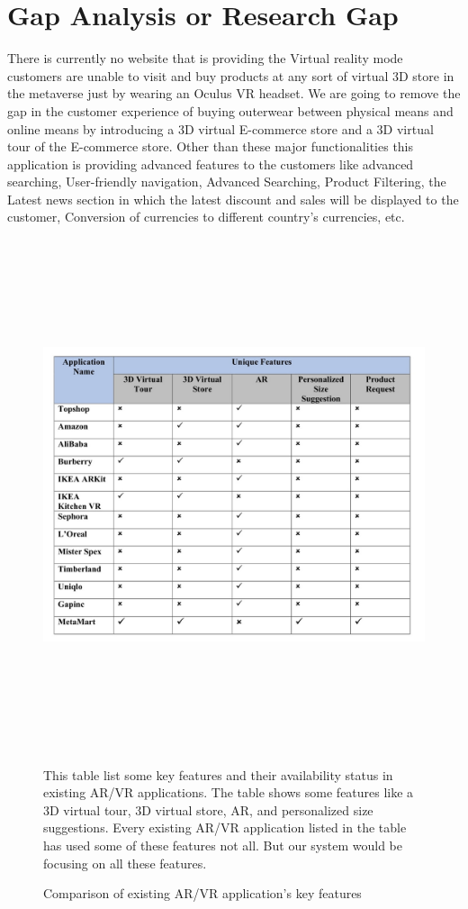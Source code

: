 \section{Gap Analysis or Research Gap}
There is currently no website that is providing the Virtual reality mode customers are unable to visit and buy products at any sort of virtual 3D store in the metaverse just by wearing an Oculus VR headset. We are going to remove the gap in the customer experience of buying outerwear between physical means and online means by introducing a 3D virtual E-commerce store and a 3D virtual tour of the E-commerce store. Other than these major functionalities this application is providing advanced features to the customers like advanced searching, User-friendly navigation, Advanced Searching, Product Filtering, the Latest news section in which the latest discount and sales will be displayed to the customer, Conversion of currencies to different country’s currencies, etc.
\begin{figure}[H]
    \centering
    \includegraphics[width=15cm,height=15cm]{Figures/Others/ComparisonTable.jpg}
    \caption{Comparison of existing AR/VR application’s key features}
    \label{fig2:Comparison of existing AR/VR application’s key features}
    \justifying
   This table list some key features and their availability status in existing AR/VR applications. The table shows some features like a 3D virtual tour, 3D virtual store, AR, and personalized size suggestions. Every existing AR/VR application listed in the table has used some of these features not all. But our system would be focusing on all these features.
\end{figure}
